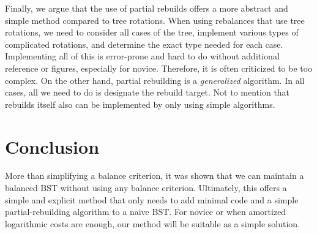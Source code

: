 \documentclass{article}
\begin{document}
Finally, we argue that the use of partial rebuilds offers a more abstract and simple method compared to tree rotations. When using rebalances that use tree rotations, we need to consider all cases of the tree, implement various types of complicated rotations, and determine the exact type needed for each case. Implementing all of this is error-prone and hard to do without additional reference or figures, especially for novice. Therefore, it is often criticized to be too complex. \cite{AnderssonAA, MunroDSL} On the other hand, partial rebuilding is a \emph{generalized} algorithm. In all cases, all we need to do is designate the rebuild target. Not to mention that rebuilds itself also can be implemented by only using simple algorithms.


\section{Conclusion}
More than simplifying a balance criterion, it was shown that we can maintain a balanced BST without using any balance criterion. Ultimately, this offers a simple and explicit method that only needs to add minimal code and a simple partial-rebuilding algorithm to a naive BST. For novice or when amortized logarithmic costs are enough, our method will be suitable as a simple solution.



\end{document}
